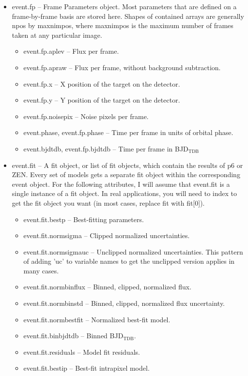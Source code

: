 \documentclass[letterpaper,12pt]{article}
\begin{document}
\begin{itemize}
\item event.fp -- Frame Parameters object. Most parameters that are defined
  on a frame-by-frame basis are stored here. Shapes of contained arrays
  are generally npos by maxnimpos, where maxnimpos is the maximum number
  of frames taken at any particular image.
  \begin{itemize}
  \item event.fp.aplev -- Flux per frame.
  \item event.fp.apraw -- Flux per frame, without background subtraction.
  \item event.fp.x -- X position of the target on the detector.
  \item event.fp.y -- Y position of the target on the detector.
  \item event.fp.noisepix -- Noise pixels per frame.
  \item event.phase, event.fp.phase -- Time per frame in units of orbital phase.
  \item event.bjdtdb, event.fp.bjdtdb -- Time per frame in BJD$_{\textrm{TDB}}$
  \end{itemize}
\item event.fit -- A fit object, or list of fit objects, which contain
  the results of p6 or ZEN. Every set of models gets a separate fit
  object within the corresponding event object. For the following
  attributes, I will assume that event.fit is a single instance of a
  fit object. In real applications, you will need to index to get the
  fit object you want (in most cases, replace fit with fit[0]).
  \begin{itemize}
  \item event.fit.bestp -- Best-fitting parameters.
  \item event.fit.normsigma -- Clipped normalized uncertainties.
  \item event.fit.normsigmauc -- Unclipped normalized uncertainties. This
    pattern of adding 'uc' to variable names to get the unclipped version
    applies in many cases.
  \item event.fit.normbinflux -- Binned, clipped, normalized flux.
  \item event.fit.normbinstd -- Binned, clipped, normalized flux uncertainty.
  \item event.fit.normbestfit -- Normalized best-fit model.
    \item event.fit.binbjdtdb -- Binned BJD$_{\textrm{TDB}}$.
  \item event.fit.residuals -- Model fit residuals.
  \item event.fit.bestip -- Best-fit intrapixel model.
  \end{itemize}
\end{itemize}
  
\end{document}
